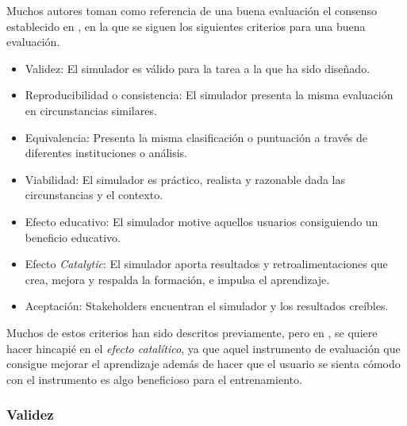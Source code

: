 Muchos autores toman como referencia de una buena evaluación el consenso establecido en  \cite{norcini2011criteria}, en la que se siguen los siguientes criterios para una buena evaluación.

\begin{itemize}
\item Validez: El simulador es válido para la tarea a la que ha sido diseñado.
\item Reproducibilidad o consistencia: El simulador presenta la misma evaluación en circunstancias similares.
\item Equivalencia: Presenta la misma clasificación o puntuación a través de diferentes instituciones o análisis.
\item Viabilidad: El simulador es práctico, realista y razonable dada las circunstancias y el contexto.
\item Efecto educativo: El simulador motive aquellos usuarios consiguiendo un beneficio educativo.
\item Efecto \emph{Catalytic}: El simulador aporta resultados y retroalimentaciones que crea, mejora y respalda la formación, e impulsa el aprendizaje.
\item Aceptación: Stakeholders  encuentran el simulador y los resultados creíbles.
\end{itemize}

Muchos de estos criterios han sido descritos previamente, pero en \cite{norcini2011criteria}, se quiere hacer hincapié en el \emph{efecto catalítico}, ya que aquel instrumento de evaluación que consigue mejorar el aprendizaje además de hacer que el usuario se sienta cómodo con el instrumento es algo beneficioso para el entrenamiento.



\subsubsection{Validez}

